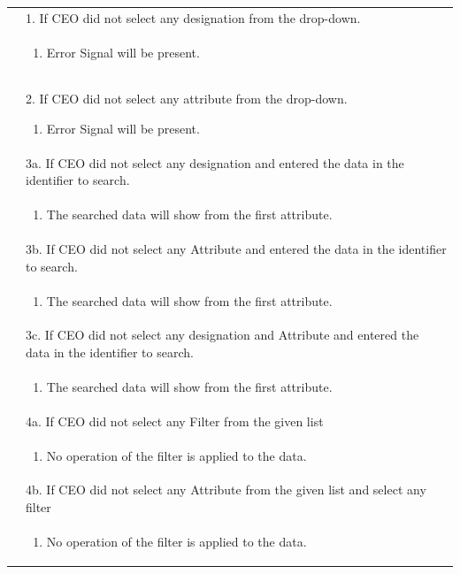 \documentclass[12pt,a4paper]{article}
\begin{document}
\begin{longtable}{| p{3cm}|p{12cm}|}
& 1. If CEO did not select any designation from the drop-down. \\
& \begin{enumerate}
		\item Error Signal will be present.
	\end{enumerate}
\\ 

      & 2. If CEO did not select any attribute from the drop-down.
 	\begin{enumerate}
		\item Error Signal will be present.
	\end{enumerate}
\\ 
& 3a. If CEO did not select any designation and entered the data in the identifier to search. \\
& \begin{enumerate}
		\item The searched data will show from the first attribute.
	\end{enumerate}
\\
& 3b. If CEO did not select any Attribute and entered the data in the identifier to search. \\
& \begin{enumerate}
		\item The searched data will show from the first attribute.
	\end{enumerate}
\\ 
& 3c. If CEO did not select any designation and  Attribute and entered the data in the identifier to search. \\
& \begin{enumerate}
		\item The searched data will show from the first attribute.
	\end{enumerate}
\\ 

& 4a. If CEO did not select any Filter from the given list \\
& \begin{enumerate}
		\item No operation of the filter is applied to the data.
	\end{enumerate}
\\ 
& 4b. If CEO did not select any Attribute from the given list and select any filter  \\
& \begin{enumerate}
		\item No operation of the filter is applied to the data.
	\end{enumerate}
\\ 


\end{longtable}
\end{document}
